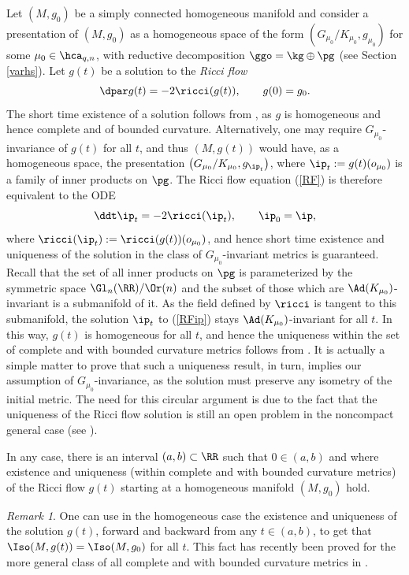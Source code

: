 \documentclass[11pt]{amsart}
\theoremstyle{plain}
\theoremstyle{definition}
\theoremstyle{remark}
\newtheorem{remark}[theorem]{Remark}
\begin{document}
Let $(M,g_0)$ be a simply connected homogeneous manifold and consider a presentation of $(M,g_0)$ as a homogeneous space of the form $\left(G_{\mu_0}/K_{\mu_0},g_{\mu_0}\right)$ for some $\mu_0\in\hca_{q,n}$, with reductive decomposition $\ggo=\kg\oplus\pg$ (see Section \ref{varhs}).  Let $g(t)$ be a solution to the {\it Ricci flow}
\begin{equation}\label{RF}
\dpar g(t)=-2\ricci(g(t)),\qquad g(0)=g_0.
\end{equation}
The short time existence of a solution follows from \cite{Shi}, as $g$ is homogeneous and hence complete and of bounded curvature. Alternatively, one may require $G_{\mu_0}$-invariance of $g(t)$ for all $t$, and thus $(M,g(t))$ would have, as a homogeneous space, the presentation $\left(G_{\mu_0}/K_{\mu_0},g_{\ip_t}\right)$, where $\ip_t:=g(t)(o_{\mu_0})$ is a family of inner products on $\pg$.  The Ricci flow equation (\ref{RF}) is therefore equivalent to the ODE
\begin{equation}\label{RFip}
\ddt \ip_t=-2\ricci(\ip_t), \qquad\ip_0=\ip,
\end{equation}
where $\ricci(\ip_t):=\ricci(g(t))(o_{\mu_0})$, and hence short time existence and uniqueness of the solution in the class of $G_{\mu_0}$-invariant metrics is guaranteed.  Recall that the set of all inner products on $\pg$ is parameterized by the symmetric space $\Gl_n(\RR)/\Or(n)$ and the subset of those which are $\Ad(K_{\mu_0})$-invariant is a submanifold of it.  As the field defined by $\ricci$ is tangent to this submanifold, the solution $\ip_t$ to (\ref{RFip}) stays $\Ad(K_{\mu_0})$-invariant for all $t$.  In this way, $g(t)$ is homogeneous for all $t$, and hence the uniqueness within the set of complete and with bounded curvature metrics follows from \cite{ChnZhu}.  It is actually a simple matter to prove that such a uniqueness result, in turn, implies our assumption of $G_{\mu_0}$-invariance, as the solution must preserve any isometry of the initial metric.  The need for this circular argument is due to the fact that the uniqueness of the Ricci flow solution is still an open problem in the noncompact general case (see \cite{Chn}).

In any case, there is an interval $(a,b)\subset\RR$ such that $0\in (a,b)$ and where existence and uniqueness (within complete and with bounded curvature metrics) of the Ricci flow $g(t)$ starting at a homogeneous manifold $(M,g_0)$ hold.

\begin{remark}
One can use in the homogeneous case the existence and uniqueness of the solution $g(t)$, forward and backward from any $t\in(a,b)$, to get that $\Iso(M,g(t))=\Iso(M,g_0)$ for all $t$.  This fact has recently been proved for the more general class of all complete and with bounded curvature metrics in \cite{Kts}.
\end{remark}
\end{document}
